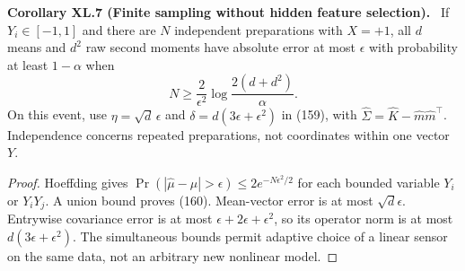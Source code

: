 \documentclass[11pt,a4paper,oneside]{book}
\newcommand{\statement}[3]{\par\medskip\noindent\textbf{#1 #2 (#3).}\ }
\begin{document}
\statement{Corollary}{XL.7}{Finite sampling without hidden feature selection}
If $Y_i\in[-1,1]$ and there are $N$ independent preparations with $X=+1$, all $d$ means and $d^2$ raw second moments have absolute error at most $\epsilon$ with probability at least $1-\alpha$ when
\begin{equation}N\ge\frac2{\epsilon^2}\log\frac{2(d+d^2)}\alpha.\tag{160}\end{equation}
On this event, use $\eta=\sqrt d\,\epsilon$ and $\delta=d(3\epsilon+\epsilon^2)$ in (159), with $\widehat\Sigma=\widehat K-\widehat m\widehat m^\top$. Independence concerns repeated preparations, not coordinates within one vector $Y$.
\begin{proof}
Hoeffding gives $\Pr(|\widehat\mu-\mu|>\epsilon)\le2e^{-N\epsilon^2/2}$ for each bounded variable $Y_i$ or $Y_iY_j$. A union bound proves (160). Mean-vector error is at most $\sqrt d\epsilon$. Entrywise covariance error is at most $\epsilon+2\epsilon+\epsilon^2$, so its operator norm is at most $d(3\epsilon+\epsilon^2)$. The simultaneous bounds permit adaptive choice of a linear sensor on the same data, not an arbitrary new nonlinear model.
\end{proof}
\end{document}
